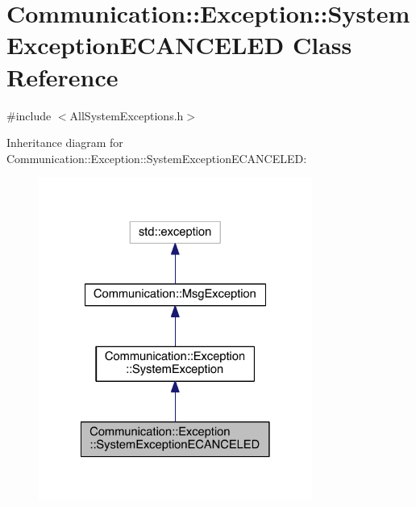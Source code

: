 \hypertarget{class_communication_1_1_exception_1_1_system_exception_e_c_a_n_c_e_l_e_d}{}\section{Communication\+:\+:Exception\+:\+:System\+Exception\+E\+C\+A\+N\+C\+E\+L\+E\+D Class Reference}
\label{class_communication_1_1_exception_1_1_system_exception_e_c_a_n_c_e_l_e_d}


{\ttfamily \#include $<$All\+System\+Exceptions.\+h$>$}



Inheritance diagram for Communication\+:\+:Exception\+:\+:System\+Exception\+E\+C\+A\+N\+C\+E\+L\+E\+D\+:\nopagebreak
\begin{figure}[H]
\begin{center}
\leavevmode
\includegraphics[width=254pt]{class_communication_1_1_exception_1_1_system_exception_e_c_a_n_c_e_l_e_d__inherit__graph}
\end{center}
\end{figure}


